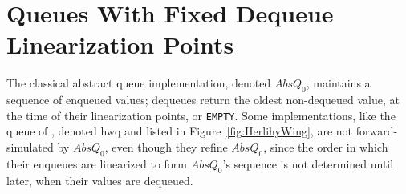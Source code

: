 \vspace{-3.5mm}
\section{Queues With Fixed Dequeue Linearization Points}\label{sec:queues}
\vspace{-1.5mm}

The classical abstract queue implementation, denoted $AbsQ_0$, maintains a
sequence of enqueued values; dequeues return the oldest non-dequeued value, at
the time of their linearization points, or {\tt EMPTY}. Some implementations,
like the queue of \citet{journals/toplas/HerlihyW90}, denoted {\sc hwq} and
listed in Figure~\ref{fig:HerlihyWing}, are not forward-simulated by $AbsQ_0$,
even though they refine $AbsQ_0$, since the order in which their enqueues are
linearized to form $AbsQ_0$’s sequence is not determined until later, when their
values are dequeued.

